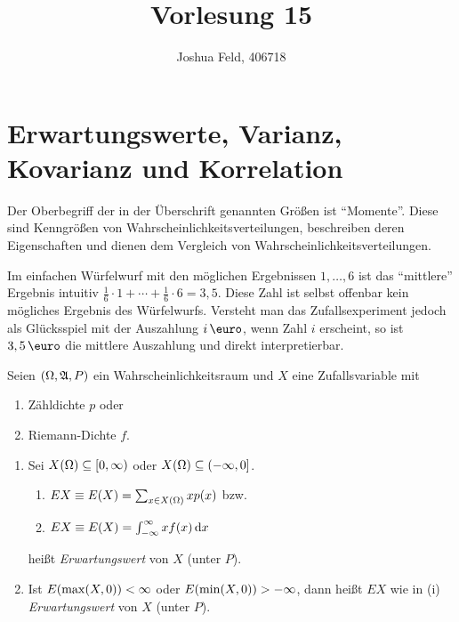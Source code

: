 \documentclass{lecture}
\institute{Institut für Statistik und Wirtschaftsmathematik}
\title{Vorlesung 15}
\author{Joshua Feld, 406718}
\begin{document}
    \maketitle


    \section*{Erwartungswerte, Varianz, Kovarianz und Korrelation}
    
    Der Oberbegriff der in der Überschrift genannten Größen ist ``Momente''.
    Diese sind Kenngrößen von Wahrscheinlichkeitsverteilungen, beschreiben deren Eigenschaften und dienen dem Vergleich von Wahrscheinlichkeitsverteilungen.
    
    Im einfachen Würfelwurf mit den möglichen Ergebnissen \(1, \ldots, 6\) ist das ``mittlere'' Ergebnis intuitiv \(\frac{1}{6} \cdot 1 + \cdots + \frac{1}{6} \cdot 6 = 3,5\).
    Diese Zahl ist selbst offenbar kein mögliches Ergebnis des Würfelwurfs.
    Versteht man das Zufallsexperiment jedoch als Glücksspiel mit der Auszahlung \(i\,\text{\euro}\), wenn Zahl \(i\) erscheint, so ist \(3,5\,\text{\euro}\) die mittlere Auszahlung und direkt interpretierbar.
    
    \begin{definition}
        Seien \(\parentheses*{\Omega, \mathfrak{A}, P}\) ein Wahrscheinlichkeitsraum und \(X\) eine Zufallsvariable mit
        \begin{enumerate}[label=\alph*)]
            \item Zähldichte \(p\) oder
            \item Riemann-Dichte \(f\).
        \end{enumerate}
        \begin{enumerate}
            \item Sei \(X\parentheses*{\Omega} \subseteq \left[0, \infty\right)\) oder \(X\parentheses*{\Omega} \subseteq \left(-\infty, 0\right]\).
            \begin{enumerate}[label=\alph*)]
                \item \(EX \equiv E\parentheses*{X} = \sum_{x \in X\parentheses*{\Omega}}xp\parentheses*{x}\) bzw.
                \item \(EX \equiv E\parentheses*{X} = \int_{-\infty}^\infty xf\parentheses*{x}\d x\)
            \end{enumerate}
            heißt \emph{Erwartungswert} von \(X\) (unter \(P\)).
            \item Ist \(E\parentheses*{\max\parentheses*{X, 0}} < \infty\) oder \(E\parentheses*{\min\parentheses*{X, 0}} > -\infty\), dann heißt \(EX\) wie in (i) \emph{Erwartungswert} von \(X\) (unter \(P\)).
        \end{enumerate}
    \end{definition}
    
\end{document}
